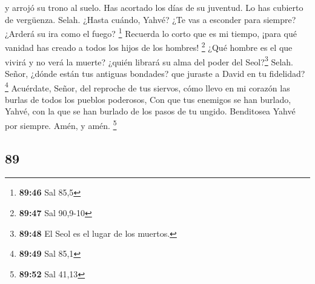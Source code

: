 \begin{paracol}{2}
y arrojó su trono al suelo.  Has acortado los días de su
juventud. Lo has cubierto de vergüenza. Selah.  ¿Hasta
cuándo, Yahvé? ¿Te vas a esconder para siempre? ¿Arderá su ira como el
fuego? \footnote{\textbf{89:46} Sal 85,5}  Recuerda lo
corto que es mi tiempo, ¡para qué vanidad has creado a todos los hijos
de los hombres! \footnote{\textbf{89:47} Sal 90,9-10} 
¿Qué hombre es el que vivirá y no verá la muerte? ¿quién librará su alma
del poder del Seol?\footnote{\textbf{89:48} El Seol es el lugar de los
  muertos.} Selah.  Señor, ¿dónde están tus antiguas
bondades? que juraste a David en tu fidelidad? \footnote{\textbf{89:49}
  Sal 85,1}  Acuérdate, Señor, del reproche de tus
siervos, cómo llevo en mi corazón las burlas de todos los pueblos
poderosos,  Con que tus enemigos se han burlado, Yahvé,
con la que se han burlado de los pasos de tu ungido. 
Benditosea Yahvé por siempre. Amén, y amén. \footnote{\textbf{89:52} Sal
  41,13}

\switchcolumn
\begin{otherlanguage}{english}

\hypertarget{section-177}{%
\section{89}\label{section-177}}


\end{otherlanguage}
\end{paracol}
